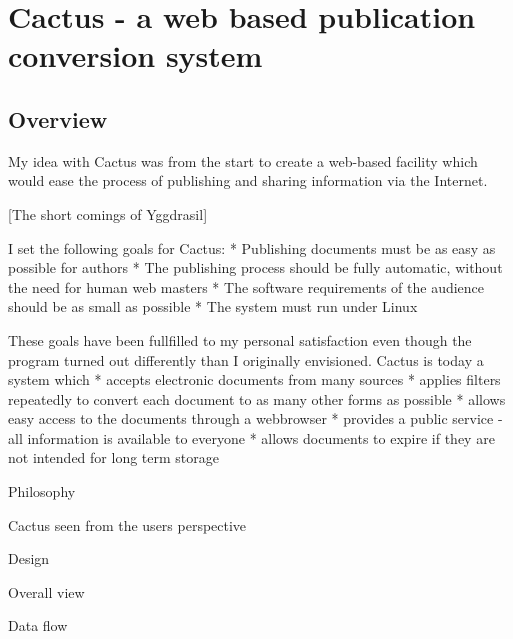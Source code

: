 



\chapter{Cactus - a web based publication conversion system}

\label{sec:cactus}

\section{Overview}

   My idea with Cactus was from the start to create a web-based facility
   which would ease the process of publishing and sharing information via
   the Internet.

   [The short comings of Yggdrasil]

   I set the following goals for Cactus:
     * Publishing documents must be as easy as possible for authors
     * The publishing process should be fully automatic, without the need
       for human web masters
     * The software requirements of the audience should be as small as
       possible
     * The system must run under Linux

   These goals have been fullfilled to my personal satisfaction even
   though the program turned out differently than I originally
   envisioned. Cactus is today a system which
     * accepts electronic documents from many sources
     * applies filters repeatedly to convert each document to as many
       other forms as possible
     * allows easy access to the documents through a webbrowser
     * provides a public service - all information is available to
       everyone
     * allows documents to expire if they are not intended for long term
       storage


   Philosophy




   Cactus seen from the users perspective


   Design

   Overall view

   Data flow

